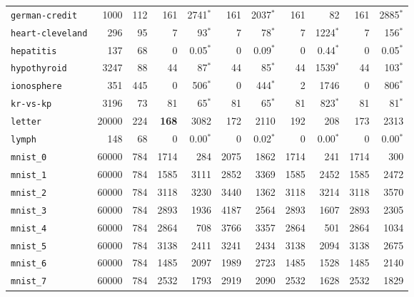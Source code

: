 \begin{tabular}{lccrrrrrrrr}
\texttt{german-credit} & \multicolumn{1}{r}{1000} & \multicolumn{1}{r}{112}  & 161 & 2741$^*$ & 161 & 2037$^*$ & 161 & 82 & 161 & 2885$^*$\\
\texttt{heart-cleveland} & \multicolumn{1}{r}{296} & \multicolumn{1}{r}{95}  & 7 & 93$^*$ & 7 & 78$^*$ & 7 & 1224$^*$ & 7 & 156$^*$\\
\texttt{hepatitis} & \multicolumn{1}{r}{137} & \multicolumn{1}{r}{68}  & 0 & 0.05$^*$ & 0 & 0.09$^*$ & 0 & 0.44$^*$ & 0 & 0.05$^*$\\
\texttt{hypothyroid} & \multicolumn{1}{r}{3247} & \multicolumn{1}{r}{88}  & 44 & 87$^*$ & 44 & 85$^*$ & 44 & 1539$^*$ & 44 & 103$^*$\\
\texttt{ionosphere} & \multicolumn{1}{r}{351} & \multicolumn{1}{r}{445}  & 0 & 506$^*$ & 0 & 444$^*$ & 2 & 1746 & 0 & 806$^*$\\
\texttt{kr-vs-kp} & \multicolumn{1}{r}{3196} & \multicolumn{1}{r}{73}  & 81 & 65$^*$ & 81 & 65$^*$ & 81 & 823$^*$ & 81 & 81$^*$\\
\texttt{letter} & \multicolumn{1}{r}{20000} & \multicolumn{1}{r}{224}  & \textbf{168} & 3082 & 172 & 2110 & 192 & 208 & 173 & 2313\\
\texttt{lymph} & \multicolumn{1}{r}{148} & \multicolumn{1}{r}{68}  & 0 & 0.00$^*$ & 0 & 0.02$^*$ & 0 & 0.00$^*$ & 0 & 0.00$^*$\\
\texttt{mnist\_0} & \multicolumn{1}{r}{60000} & \multicolumn{1}{r}{784}  & 1714 & 284 & 2075 & 1862 & 1714 & 241 & 1714 & 300\\
\texttt{mnist\_1} & \multicolumn{1}{r}{60000} & \multicolumn{1}{r}{784}  & 1585 & 3111 & 2852 & 3369 & 1585 & 2452 & 1585 & 2472\\
\texttt{mnist\_2} & \multicolumn{1}{r}{60000} & \multicolumn{1}{r}{784}  & 3118 & 3230 & 3440 & 1362 & 3118 & 3214 & 3118 & 3570\\
\texttt{mnist\_3} & \multicolumn{1}{r}{60000} & \multicolumn{1}{r}{784}  & 2893 & 1936 & 4187 & 2564 & 2893 & 1607 & 2893 & 2305\\
\texttt{mnist\_4} & \multicolumn{1}{r}{60000} & \multicolumn{1}{r}{784}  & 2864 & 708 & 3766 & 3357 & 2864 & 501 & 2864 & 1034\\
\texttt{mnist\_5} & \multicolumn{1}{r}{60000} & \multicolumn{1}{r}{784}  & 3138 & 2411 & 3241 & 2434 & 3138 & 2094 & 3138 & 2675\\
\texttt{mnist\_6} & \multicolumn{1}{r}{60000} & \multicolumn{1}{r}{784}  & 1485 & 2097 & 1989 & 2723 & 1485 & 1528 & 1485 & 2140\\
\texttt{mnist\_7} & \multicolumn{1}{r}{60000} & \multicolumn{1}{r}{784}  & 2532 & 1793 & 2919 & 2090 & 2532 & 1628 & 2532 & 1829\\

\end{tabular}
